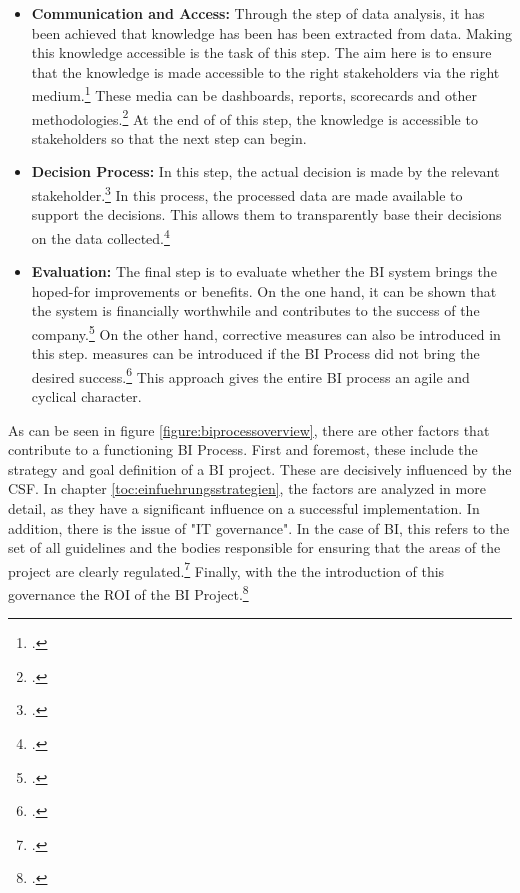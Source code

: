 \begin{itemize}
    decision-making processes.\footcite[Cf.][p. 94]{hovcevar2010assessing}
    \item \textbf{Communication and Access: }Through the step of data analysis, it has been achieved that knowledge has been
    has been extracted from data. Making this knowledge accessible is the task of this step. The aim here is to ensure that the knowledge
    is made accessible to the right stakeholders via the right medium.\footcite[Cf.][p. 11]{foley2010business} These
    media can be dashboards, reports, scorecards and other methodologies.\footcite[Cf.][pp. 21]{niu2009cognition} At the end of
    of this step, the knowledge is accessible to stakeholders so that the next step can begin.
    \item \textbf{Decision Process: }In this step, the actual decision is made by the relevant stakeholder.\footcite[Cf.][p. 12]{foley2010business}
    In this process, the processed data are made available to support the
    decisions. This allows them to transparently base their decisions on the data collected.\footcite[Cf.][p. 13]{kasemsap2016fundamentals}
    \item \textbf{Evaluation: }The final step is to evaluate whether the \ac{BI} system brings the hoped-for improvements or benefits.
    On the one hand, it can be shown that the system is financially worthwhile and contributes to the success of the company.\footcite[Cf.][p. 12]{foley2010business}
    On the other hand, corrective measures can also be introduced in this step.
    measures can be introduced if the \ac{BI} Process did not bring the desired success.\footcite[Cf.][p. 12]{foley2010business}
    This approach gives the entire \ac{BI} process an agile and cyclical character.
\end{itemize}

As can be seen in figure \ref{figure:biprocessoverview}, there are other factors that contribute to a functioning
\ac{BI} Process. First and foremost, these include the strategy and goal definition of a \ac{BI} project. These are decisively
influenced by the \ac{CSF}. In chapter \ref{toc:einfuehrungsstrategien}, the factors are analyzed in more detail, as they have a
significant influence on a successful implementation. In addition, there is the issue of "IT governance".
In the case of \ac{BI}, this refers to the set of all guidelines and the bodies responsible for ensuring that the
areas of the project are clearly regulated.\footcite[Cf.][p. 8]{foley2010business} Finally, with the
the introduction of this governance the \ac{ROI} of the \ac{BI} Project.\footcite[Cf.][p. 8]{foley2010business}

